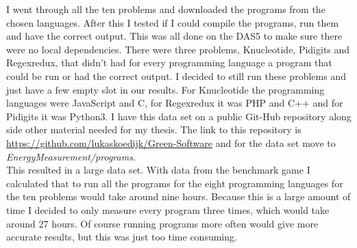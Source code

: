 I went through all the ten problems and downloaded the programs from the chosen languages. After this I tested if I could compile the programs, run them and have the correct output. This was all done on the DAS5 to make sure there were no local dependencies. There were three problems, Knucleotide, Pidigits and Regexredux, that didn't had for every programming language a program that could be run or had the correct output. I decided to still run these problems and just have a few empty slot in our results. For Knucleotide the programming languages were JavaScript and C, for Regexredux it was PHP and C++ and for Pidigits it was Python3. I have this data set on a public Git-Hub repository along side other material needed for my thesis. The link to this repository is \url{https://github.com/lukaskoedijk/Green-Software} and for the data set move to \textit{EnergyMeasurement/programs}.\\

This resulted in a large data set. With data from the benchmark game I calculated that to run all the programs for the eight programming languages for the ten problems would take around nine hours. Because this is a large amount of time I decided to only measure every program three times, which would take around 27 hours. Of course running programs more often would give more accurate results, but this was just too time consuming.\\

